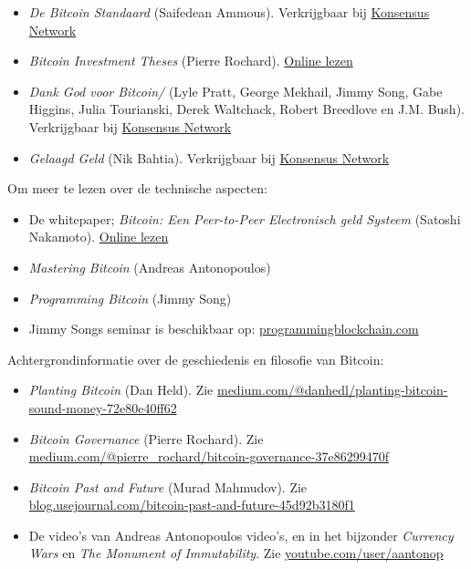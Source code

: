 \documentclass[
  letterpaper,
]{scrbook}
\begin{document}
\begin{itemize}
\item
  \emph{De Bitcoin Standaard} (Saifedean Ammous). Verkrijgbaar bij
  \href{https://konsensus.network/product/de-bitcoin-standaard}{Konsensus
  Network}
\item
  \emph{Bitcoin Investment Theses} (Pierre Rochard).
  \href{https://pierre-rochard.medium.com/bitcoin-investment-theses-part-1-e97670b5389b}{Online
  lezen}
\item
  \emph{Dank God voor Bitcoin/} (Lyle Pratt, George Mekhail, Jimmy Song,
  Gabe Higgins, Julia Tourianski, Derek Waltchack, Robert Breedlove en
  J.M. Bush). Verkrijgbaar bij
  \href{https://konsensus.network/product/dank-god-voor-bitcoin/}{Konsensus
  Network}
\item
  \emph{Gelaagd Geld} (Nik Bahtia). Verkrijgbaar bij
  \href{https://konsensus.network/product/gelaagd-geld/}{Konsensus
  Network}
\end{itemize}

Om meer te lezen over de technische aspecten:

\begin{itemize}
\item
  De whitepaper; \emph{Bitcoin: Een Peer-to-Peer Electronisch geld
  Systeem} (Satoshi Nakamoto).
  \href{https://bitcoin.org/files/bitcoin-paper/bitcoin_nl.pdf}{Online
  lezen}
\item
  \emph{Mastering Bitcoin} (Andreas Antonopoulos)
\item
  \emph{Programming Bitcoin} (Jimmy Song)
\item
  Jimmy Songs seminar is beschikbaar op:
  \href{https://programmingblockchain.com}{programmingblockchain.com}
\end{itemize}

Achtergrondinformatie over de geschiedenis en filosofie van Bitcoin:

\begin{itemize}
\item
  \emph{Planting Bitcoin} (Dan Held). Zie
  \href{https://medium.com/@danhedl/planting-bitcoin-sound-money-72e80e40ff62}{medium.com/@danhedl/planting-bitcoin-sound-money-72e80e40ff62}
\item
  \emph{Bitcoin Governance} (Pierre Rochard). Zie
  \href{https://medium.com/@pierre_rochard/bitcoin-governance-37e86299470f}{medium.com/@pierre\_rochard/bitcoin-governance-37e86299470f}
\item
  \emph{Bitcoin Past and Future} (Murad Mahmudov). Zie
  \href{https://blog.usejournal.com/bitcoin-past-and-future-45d92b3180f1}{blog.usejournal.com/bitcoin-past-and-future-45d92b3180f1}
\item
  De video's van Andreas Antonopoulos video's, en in het bijzonder
  \emph{Currency Wars} en \emph{The Monument of Immutability}. Zie
  \href{https://www.youtube.com/user/aantonop}{youtube.com/user/aantonop}
\end{itemize}
\end{document}
